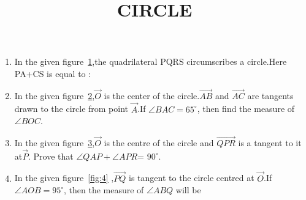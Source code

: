 \documentclass[12pt,A4 paper]{article}
\begin{document}
\title{\textbf{CIRCLE}}
\date{}
\maketitle

\begin{enumerate}
	\item In the given figure~\ref{fig:1},the quadrilateral PQRS circumscribes a circle.Here PA+CS is equal to : \\

\begin{figure}[h]
	        \centering
		
		\caption{}
		\label{fig:1}
\end{figure}



 \begin{figure}[h]
	        \centering
	        
 \end{figure}




\item In the given figure~\ref{fig 2},$\vec{O}$ is the center of the circle.$\overrightarrow{AB}$ and $\overrightarrow{AC}$ are tangents drawn to the circle from point $\vec{ A}$.If $\angle BAC=65^{\circ}$, then find the measure of $\angle BOC$.\\


	\begin{center}
\begin{figure}[h]
	        \centering
	        
		\caption{}
		\label{fig 2}
        \end{figure}
	\end{center}


\pagebreak

\item In the given figure~\ref{fig:3},$\vec{ O}$ is the centre of the circle and $\overrightarrow {QPR}$ is a tangent to it at$\vec{ P}$. Prove that $\angle QAP+ \angle APR$= $90^{\circ}$.\\
\begin{figure}[h]
	        \centering
	        
		\caption{}
		\label{fig:3}

        \end{figure}


\item In the given figure~\ref{fig:4} ,$\overrightarrow{PQ}$ is tangent to the circle centred at $\vec{ O}$.If $\angle AOB= 95^{\circ}$, then the measure of $\angle ABQ$ will be



\end{enumerate}
\end{document}
